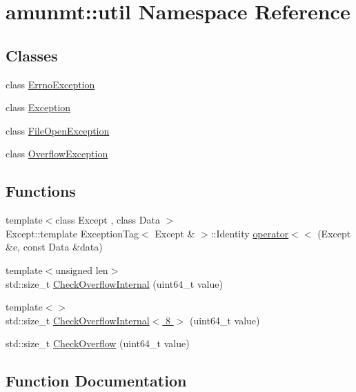 \hypertarget{namespaceamunmt_1_1util}{}\section{amunmt\+:\+:util Namespace Reference}
\label{namespaceamunmt_1_1util}
\subsection*{Classes}
\begin{DoxyCompactItemize}
\item 
class \hyperlink{classamunmt_1_1util_1_1ErrnoException}{Errno\+Exception}
\item 
class \hyperlink{classamunmt_1_1util_1_1Exception}{Exception}
\item 
class \hyperlink{classamunmt_1_1util_1_1FileOpenException}{File\+Open\+Exception}
\item 
class \hyperlink{classamunmt_1_1util_1_1OverflowException}{Overflow\+Exception}
\end{DoxyCompactItemize}
\subsection*{Functions}
\begin{DoxyCompactItemize}
\item 
{\footnotesize template$<$class Except , class Data $>$ }\\Except\+::template Exception\+Tag$<$ Except \& $>$\+::Identity \hyperlink{namespaceamunmt_1_1util_ad11a5ac29536e2a368b1eae6d5bdf229}{operator$<$$<$} (Except \&e, const Data \&data)
\item 
{\footnotesize template$<$unsigned len$>$ }\\std\+::size\+\_\+t \hyperlink{namespaceamunmt_1_1util_a6b045ed350fadf8a2a9d7bd567b5c546}{Check\+Overflow\+Internal} (uint64\+\_\+t value)
\item 
{\footnotesize template$<$$>$ }\\std\+::size\+\_\+t \hyperlink{namespaceamunmt_1_1util_a4ab09a7fed571a65813b862e6a2cbd58}{Check\+Overflow\+Internal$<$ 8 $>$} (uint64\+\_\+t value)
\item 
std\+::size\+\_\+t \hyperlink{namespaceamunmt_1_1util_a50f412a2b0340540782aef99cc9f2734}{Check\+Overflow} (uint64\+\_\+t value)
\end{DoxyCompactItemize}


\subsection{Function Documentation}
